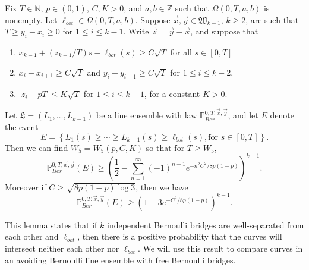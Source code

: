 \begin{lemma}\label{CurveSeparation} Fix $T\in\mathbb{N}$, $p\in (0,1)$, $C,K>0$, and $a,b\in \mathbb{Z}$ such that $\Omega(0,T,a,b)$ is nonempty. Let $\ell_{bot} \in \Omega(0,T,a,b)$. Suppose $\vec{x},\vec{y}\in\mathfrak{W}_{k-1}$, $k\geq 2$, are such that $T \geq y_i - x_i \geq 0$ for $1\leq i\leq k-1$. Write $\vec{z} = \vec{y} - \vec{x}$, and suppose that
	\begin{enumerate}[label=(\arabic*)]
		
		\item $x_{k-1} + (z_{k-1}/T)s - \ell_{bot}(s) \geq C\sqrt{T}$ for all $s\in[0,T]$
		
		\item $x_i - x_{i+1} \geq C\sqrt{T}$ and $y_i - y_{i+1} \geq C\sqrt{T}$ for $1\leq i\leq k-2$,
		
		\item $|z_i - pT| \leq K\sqrt{T}$ for $1\leq i\leq k-1$, for a constant $K > 0$.
		
	\end{enumerate}
	Let $\mathfrak{L} = (L_1,\dots,L_{k-1})$ be a line ensemble with law $\mathbb{P}^{0,T,\vec{x},\vec{y}}_{Ber}$, and let $E$ denote the event 
	\[ E=\left\{L_1(s)\geq \cdots \geq L_{k-1}(s)\geq \ell_{bot}(s), \text{for } s\in [0,T]\right\}.
	\] 
	Then we can find $W_5 = W_5(p,C,K)$ so that for $T\geq W_5$,
	\begin{equation}\label{SepBound1}
	\mathbb{P}^{0,T,\vec{x},\vec{y}}_{Ber}(E) \geq \left(\frac{1}{2} - \sum_{n=1}^\infty (-1)^{n-1} e^{-n^2C^2/8p(1-p)}\right)^{k-1}.
	\end{equation}
	Moreover if $C \geq \sqrt{8p(1-p)\log 3}$, then we have
	\begin{equation}\label{SepBound2}
	\mathbb{P}^{0,T,\vec{x},\vec{y}}_{Ber}(E) \geq \left(1 - 3e^{-C^2/8p(1-p)}\right)^{k-1}.
	\end{equation}
\end{lemma}

\begin{remark}
	This lemma states that if $k$ independent Bernoulli bridges are well-separated from each other and $\ell_{bot}$, then there is a positive probability that the curves will intersect neither each other nor $\ell_{bot}$. We will use this result to compare curves in an avoiding Bernoulli line ensemble with free Bernoulli bridges.
\end{remark}

